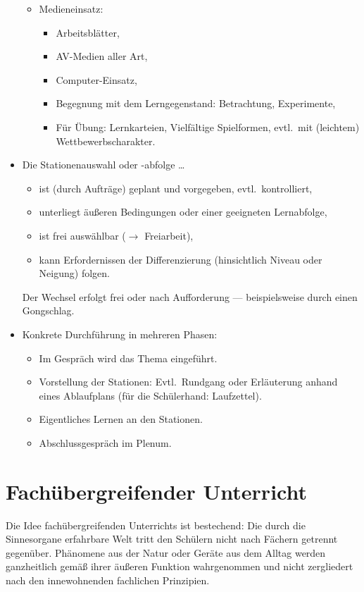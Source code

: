 \begin{itemize}
\begin{itemize}
\item Medieneinsatz:
\begin{itemize}
\item Arbeitsbl\"{a}tter,
\item AV-Medien aller Art,
\item Computer-Einsatz,
\item Begegnung mit dem Lerngegenstand: Betrachtung, Experimente,
\item F\"{u}r \"{U}bung: Lernkarteien, Vielf\"{a}ltige Spielformen, evtl.\ mit (leichtem) Wettbewerbscharakter.
\end{itemize}
\end{itemize}

\item Die Stationenauswahl oder -abfolge \dots
\begin{itemize}
\item ist (durch Auftr\"{a}ge) geplant und vorgegeben, evtl.\ kontrolliert,
\item unterliegt \"{a}u{\ss}eren Bedingungen oder einer geeigneten Lernabfolge,
\item ist frei ausw\"{a}hlbar ($\to$ Freiarbeit),
\item kann Erfordernissen der Differenzierung (hinsichtlich Niveau oder Neigung) folgen.
\end{itemize}

Der Wechsel erfolgt frei oder nach Aufforderung --- beispielsweise durch einen Gongschlag.
\item
Konkrete Durchf\"{u}hrung in mehreren Phasen:
\begin{itemize}
\item Im Gespr\"{a}ch wird das Thema eingef\"{u}hrt.
\item Vorstellung der Stationen: Evtl.\ Rundgang oder Erl\"{a}uterung anhand eines Ablaufplans
(f\"{u}r die Sch\"{u}lerhand: Laufzettel).
\item Eigentliches Lernen an den Stationen.
\item Abschlussgespr\"{a}ch im Plenum.

\end{itemize}

\end{itemize}

\bip\bip
\section{Fach\"{u}bergreifender Unterricht}
Die Idee fachübergreifenden Unterrichts ist bestechend: Die durch die Sinnesorgane
	erfahrbare Welt tritt den Sch\"{u}lern nicht nach F\"{a}chern
	getrennt gegen\"{u}ber.
	Ph\"{a}nomene aus der Natur oder Ger\"{a}te aus dem Alltag
	werden ganzheitlich gem\"{a}{\ss} ihrer \"{a}u{\ss}eren Funktion wahrgenommen
	und nicht zergliedert nach den innewohnenden fachlichen Prinzipien.

